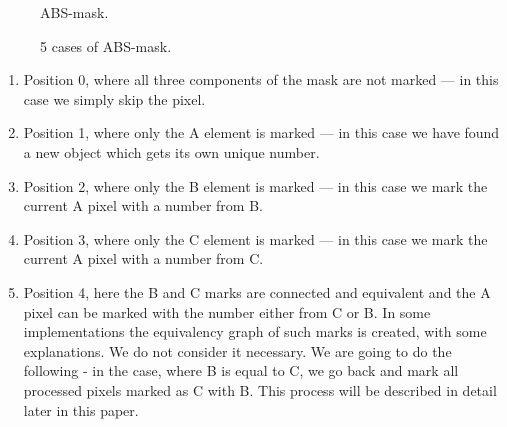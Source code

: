 \documentclass[12pt,a4paper,oneside,titlepage]{article}
\begin{document}



\begin{figure}[h]
  \caption{ABS-mask.}
  \label{fig:abc_mask}
\end{figure}



\begin{figure}[h]
  \caption{5 cases of ABS-mask.}
  \label{fig:abc_all_cases}
\end{figure}


\begin{enumerate}
	\item Position 0, where all three components of the mask are not marked — in this case we simply skip the pixel.
	\item Position 1, where only the A element is marked — in this case we have found a new object which gets its own unique number.
	\item Position 2, where only the B element is marked — in this case we mark the current  A pixel with a number from B.
	\item Position 3, where only the C element is marked — in this case we mark the current  A pixel with a number from C.
	\item Position 4, here the B and C marks are connected and equivalent  and the A pixel can be marked with the number either from C or B. In some implementations the equivalency graph of such marks is created, with some explanations. We do not consider it necessary. We are going to do the following - in the case, where B is equal to C, we go back and mark all processed pixels marked as C with B. This process will be described in detail later in this paper. 
\end{enumerate}
\end{document}
